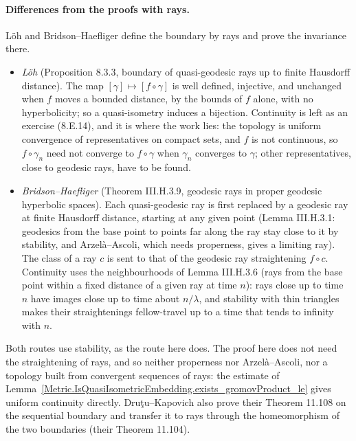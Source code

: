 \paragraph{Differences from the proofs with rays.} L\"oh and Bridson--Haefliger define the boundary
by rays and prove the invariance there.
\begin{itemize}
  \item \emph{L\"oh} (Proposition 8.3.3, boundary of quasi-geodesic rays up to finite Hausdorff
        distance). The map $[\gamma] \mapsto [f \circ \gamma]$ is well defined, injective, and
        unchanged when $f$ moves a bounded distance, by the bounds of $f$ alone, with no
        hyperbolicity; so a quasi-isometry induces a bijection. Continuity is left as an exercise
        (8.E.14), and it is where the work lies: the topology is uniform convergence of
        representatives on compact sets, and $f$ is not continuous, so $f \circ \gamma_n$ need not
        converge to $f \circ \gamma$ when $\gamma_n$ converges to $\gamma$; other representatives,
        close to geodesic rays, have to be found.
  \item \emph{Bridson--Haefliger} (Theorem III.H.3.9, geodesic rays in proper geodesic hyperbolic
        spaces). Each quasi-geodesic ray is first replaced by a geodesic ray at finite Hausdorff
        distance, starting at any given point (Lemma III.H.3.1: geodesics from the base point to
        points far along the ray stay close to it by stability, and Arzel\`a--Ascoli, which needs
        properness, gives a limiting ray). The class of a ray $c$ is sent to that of the geodesic
        ray straightening $f \circ c$. Continuity uses the neighbourhoods of Lemma III.H.3.6 (rays
        from the base point within a fixed distance of a given ray at time $n$): rays close up to
        time $n$ have images close up to time about $n/\lambda$, and stability with thin
        triangles makes their straightenings fellow-travel up to a time that tends to infinity
        with $n$.
\end{itemize}
Both routes use stability, as the route here does. The proof here does not need the straightening
of rays, and so neither properness nor Arzel\`a--Ascoli, nor a topology built from convergent
sequences of rays: the estimate of
Lemma~\ref{Metric.IsQuasiIsometricEmbedding.exists_gromovProduct_le} gives uniform continuity
directly. Dru\c{t}u--Kapovich also prove their Theorem 11.108 on the sequential boundary and
transfer it to rays through the homeomorphism of the two boundaries (their Theorem 11.104).

